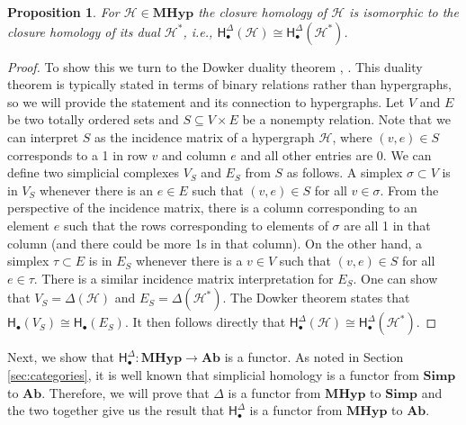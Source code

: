 \documentclass{amsart}
\newtheorem{proposition}[theorem]{Proposition}
\newcommand{\Simp}{\mathrm{\textbf{Simp}}}
\newcommand{\Ab}{\mathrm{\textbf{Ab}}}
\newcommand{\MHyp}{\mathrm{\textbf{MHyp}}}
\newcommand{\Hgroup}	     {\mathsf{H}}
\renewcommand{\hom}[2]{\Hgroup_{#2}^{#1}}
\renewcommand{\H}{\mathcal{H}}
\begin{document}
\begin{proposition}
For $\H \in \MHyp$ the closure homology of $\H$ is isomorphic to the closure homology of its dual $\H^*$, i.e., $\hom{\Delta}{\bullet}(\H) \cong \hom{\Delta}{\bullet}(\H^*)$. 
\end{proposition}
\begin{proof}
To show this we turn to the Dowker duality theorem \cite[Theorem 1a]{dowker1952homology}, \cite[Corollary 3]{chowdhury2018functorial}.
This duality theorem is typically stated in terms of binary relations rather than hypergraphs, so we will provide the statement and its connection to hypergraphs.
Let $V$ and $E$ be two totally ordered sets and $S \subseteq V \times E$ be a nonempty relation. 
Note that we can interpret $S$ as the incidence matrix of a hypergraph $\H$, where $(v,e) \in S$ corresponds to a 1 in row $v$ and column $e$ and all other entries are 0.
We can define two simplicial complexes $V_S$ and $E_S$ from $S$ as follows. 
A simplex $\sigma \subset V$ is in  $V_S$ whenever there is an $e \in E$ such that $(v, e) \in S$ for all $v \in \sigma$. 
From the perspective of the incidence matrix, there is a column corresponding to an element $e$ such that the rows corresponding to elements of $\sigma$ are all 1 in that column (and there could be more 1s in that column).
On the other hand, a simplex $\tau \subset E$ is in $E_S$ whenever there is a $v \in V$ such that $(v,e) \in S$ for all $e \in \tau$.
There is a similar incidence matrix interpretation for $E_S$.
One can show that $V_S = \Delta(\H)$ and $E_S = \Delta(\H^*)$. 
The Dowker theorem states that $\hom{}{\bullet}(V_S) \cong \hom{}{\bullet}(E_S)$. 
It then follows directly that $\hom{\Delta}{\bullet}(\H) \cong \hom{\Delta}{\bullet}(\H^*)$.
\end{proof}

Next, we show that $\hom{\Delta}{\bullet} : \MHyp \rightarrow \Ab$ is a functor. 
As noted in Section \ref{sec:categories}, it is well known that simplicial homology is a functor from $\Simp$ to $\Ab$. 
Therefore, we will prove that $\Delta$ is a functor from $\MHyp$ to $\Simp$ and the two together give us the result that $\hom{\Delta}{\bullet}$ is a functor from $\MHyp$ to $\Ab$.
\end{document}
